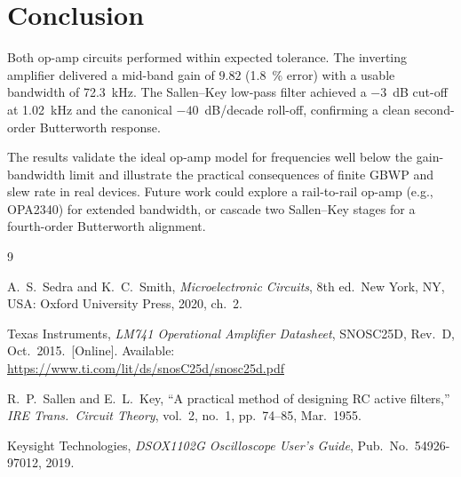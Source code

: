 \section{Conclusion}

Both op-amp circuits performed within expected tolerance.  The inverting
amplifier delivered a mid-band gain of $9.82$ (\qty{1.8}{\percent} error)
with a usable bandwidth of \qty{72.3}{\kHz}.  The Sallen--Key low-pass
filter achieved a \qty{-3}{\dB} cut-off at \qty{1.02}{\kHz} and the
canonical $-40$~dB/decade roll-off, confirming a clean second-order
Butterworth response.

The results validate the ideal op-amp model for frequencies well below the
gain-bandwidth limit and illustrate the practical consequences of finite
GBWP and slew rate in real devices.  Future work could explore a
rail-to-rail op-amp (e.g., OPA2340) for extended bandwidth, or cascade
two Sallen--Key stages for a fourth-order Butterworth alignment.


\begin{thebibliography}{9}

A.\ S.\ Sedra and K.\ C.\ Smith,
\textit{Microelectronic Circuits}, 8th ed.\
New York, NY, USA: Oxford University Press, 2020, ch.\ 2.

Texas Instruments,
\textit{LM741 Operational Amplifier Datasheet}, SNOSC25D,
Rev.\ D, Oct.\ 2015.\ [Online].
Available: \url{https://www.ti.com/lit/ds/snosC25d/snosc25d.pdf}

R.\ P.\ Sallen and E.\ L.\ Key,
``A practical method of designing RC active filters,''
\textit{IRE Trans.\ Circuit Theory}, vol.\ 2, no.\ 1,
pp.\ 74--85, Mar.\ 1955.

Keysight Technologies,
\textit{DSOX1102G Oscilloscope User's Guide},
Pub.\ No.\ 54926-97012, 2019.

\end{thebibliography}
